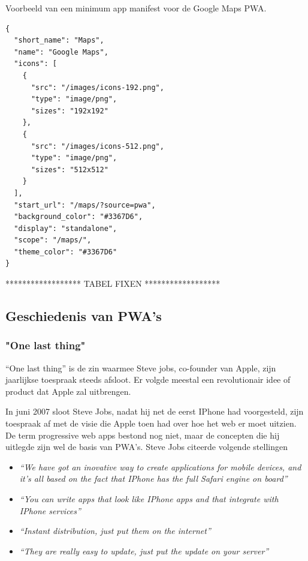 Voorbeeld van een minimum app manifest voor de Google Maps PWA.

\begin{lstlisting}
{
  "short_name": "Maps",
  "name": "Google Maps",
  "icons": [
    {
      "src": "/images/icons-192.png",
      "type": "image/png",
      "sizes": "192x192"
    },
    {
      "src": "/images/icons-512.png",
      "type": "image/png",
      "sizes": "512x512"
    }
  ],
  "start_url": "/maps/?source=pwa",
  "background_color": "#3367D6",
  "display": "standalone",
  "scope": "/maps/",
  "theme_color": "#3367D6"
}
\end{lstlisting}






****************** TABEL FIXEN  ******************

\autocite{LePage2020}

\subsection{Geschiedenis van PWA's}

\subsubsection{"One last thing"}

 “One last thing” is de zin waarmee Steve jobs, co-founder van Apple, zijn jaarlijkse toespraak steeds afsloot. Er volgde meestal een revolutionair idee of product dat Apple zal uitbrengen.

In juni 2007 sloot Steve Jobs, nadat hij net de eerst IPhone had voorgesteld, zijn toespraak af met de visie die Apple toen had over hoe het web er moet uitzien. De term progressive web apps bestond nog niet, maar de concepten die hij uitlegde zijn wel de basis van PWA’s. Steve Jobs citeerde volgende stellingen


\begin{itemize}
	\item \textit{ “We have got an inovative way to create applications for mobile devices, and it’s all based on the fact that IPhone has the full Safari engine on board”}
	\item \textit{ “You can write apps that look like IPhone apps and that integrate with IPhone services”}
	\item \textit{ “Instant distribution, just put them on the internet”}
	\item \textit{ “They are really easy to update, just put the update on your server”}
\end{itemize}

